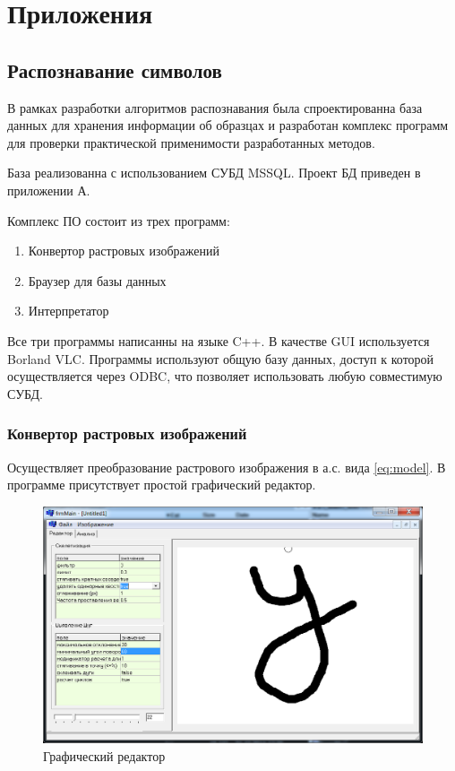 \chapter{Приложения} \label{chapt3}
\section{Распознавание символов}
В рамках разработки алгоритмов распознавания была спроектированна база данных для хранения информации об образцах и разработан комплекс программ для проверки практической применимости разработанных методов. 

База реализованна с использованием СУБД MSSQL. Проект БД приведен в приложении А.

Комплекс ПО состоит из трех программ:
\begin{enumerate}
\item Конвертор растровых изображений
\item Браузер для базы данных
\item Интерпретатор 
\end{enumerate}
Все три программы написанны на языке C++. В качестве GUI используется Borland VLC. Программы используют общую базу данных, доступ к которой осуществляется через ODBC, что позволяет использовать любую совместимую СУБД.

\subsection{Конвертор растровых изображений}
\noindent
Осуществляет преобразование растрового изображения в а.с. вида \ref{eq:model}. В программе присутствует простой графический редактор.

\begin{figure}[h]
	\centering
	\includegraphics[scale=0.25]{images/an_convertor_2}
	\caption{Графический редактор}
	\label{em_img_program}
\end{figure}

